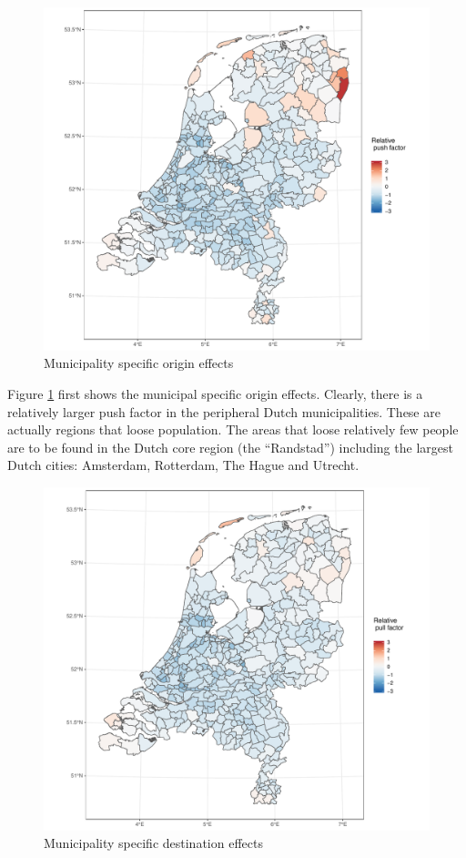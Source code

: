 \documentclass[fleqn,10pt]{SelfArx} %
\begin{document}
{{\begin{figure}
		\centering
		\includegraphics[width = \columnwidth]{../fig/p_coef_out.pdf}
		\caption{Municipality specific origin effects}\label{fig:out}
\end{figure}

Figure \ref{fig:out} first shows the municipal specific origin effects. Clearly, there is a relatively larger push factor in the peripheral Dutch municipalities. These are actually regions that loose population. The areas that loose relatively few people are to be found in the Dutch core region (the ``Randstad'') including the largest Dutch cities: Amsterdam, Rotterdam, The Hague and Utrecht.  

\begin{figure}
	\centering
	\includegraphics[width = \columnwidth]{../fig/p_coef_in.pdf}
	\caption{Municipality specific destination effects}\label{fig:in}
\end{figure}

}}
\end{document}
